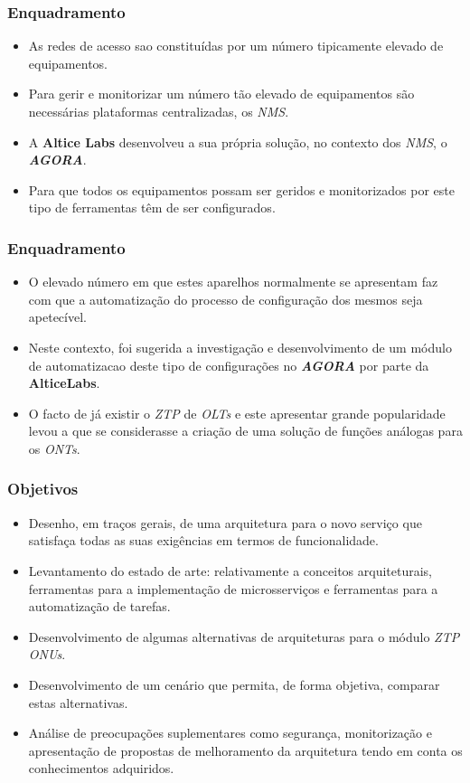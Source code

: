 \begin{frame}
    \frametitle{Enquadramento}
    \begin{itemize} 
        \item As redes de acesso sao constituídas por um número tipicamente
        elevado de equipamentos.
        \item Para gerir e monitorizar um número tão elevado de equipamentos são
        necessárias plataformas centralizadas, os \textit{NMS}.
        \item A \textbf{Altice Labs} desenvolveu a sua própria solução, no
        contexto dos \textit{NMS}, o \textit{\textbf{AGORA}}. 
        \item Para que todos os equipamentos possam ser geridos e monitorizados
        por este tipo de ferramentas têm de ser configurados. 
    \end{itemize}
\end{frame}

\begin{frame}
    \frametitle{Enquadramento}
    \begin{itemize}
        \item O elevado número em que estes aparelhos normalmente se apresentam
        faz com que a automatização do processo de configuração dos mesmos seja
        apetecível.
        \item Neste contexto, foi sugerida a investigação e desenvolvimento de
        um módulo de automatizacao deste tipo de configurações no
        \textit{\textbf{AGORA}} por parte da \textbf{AlticeLabs}. 
        \item O facto de já existir o \textit{ZTP} de \textit{OLTs} e este
        apresentar grande popularidade levou a que se considerasse a criação de
        uma solução de funções análogas para os \textit{ONTs}. 
    \end{itemize}
\end{frame}

\begin{frame}
    \frametitle{\checkmark \hspace{1mm} Objetivos}
    \begin{itemize}
        \item Desenho, em traços gerais, de uma arquitetura para o novo serviço
        que satisfaça todas as suas exigências em termos de funcionalidade. 
        \item Levantamento do estado de arte: relativamente a conceitos
        arquiteturais, ferramentas para a implementação de microsserviços e
        ferramentas para a automatização de tarefas.
        \item Desenvolvimento de algumas alternativas de arquiteturas para o
        módulo \textit{ZTP ONUs}.
        \item Desenvolvimento de um cenário que permita, de forma objetiva,
        comparar estas alternativas. 
        \item Análise de preocupações suplementares como segurança,
        monitorização e apresentação de propostas de melhoramento da arquitetura
        tendo em conta os conhecimentos adquiridos. 
    \end{itemize}
\end{frame}